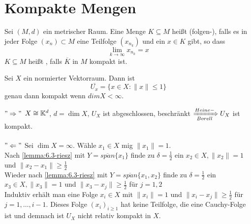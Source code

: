 
\chapter{Kompakte Mengen}

\begin{definition}  
	Sei $(M, d)$ ein metrischer Raum. Eine Menge $K \subseteq M$ hei{\ss}t (folgen-), falls es in jeder Folge $(x_{n}) \subset M$ eine Teilfolge $(x_{n_{k}})$ und ein $x \in K$ gibt, so dass 
		\[ \lim_{k \rightarrow \infty} x_{n_{k}} = x \]
		$K \subseteq M$ hei{\ss}t , falls $\overline{K}$ in $M$ kompakt ist.
\end{definition}

\begin{satz}
	Sei $X$ ein normierter Vektorraum. Dann ist
	\[ \overline{U_{x}} = \{ x \in X: \| x \| \leq 1 \} \]
	genau dann kompakt wenn $dim X < \infty$.
\end{satz}
 	\begin{beweis}
		$"\Rightarrow"$ $X \cong \mathbb{K}^{d}$, $d = \dim X$, $U_X$ ist abgeschlossen, beschränkt $\xRightarrow[Borell]{Heine-} U_{X}$ ist kompakt. \\ \\
		$"\Leftarrow"$ Sei $\dim X = \infty$. Wähle $x_1 \in X$ mig $\| x_1 \| = 1$. \\
		Nach \eqref{lemma:6.3-riesz} mit $ Y = \overline{span}\{ x_{1} \}$ finde zu $\delta = \frac{1}{2}$ ein $x_{2} \in X, \| x_{2} \| = 1$ und $\| x_{2} - x_{1} \| \geq \frac{1}{2}$ \\
		Wieder nach \eqref{lemma:6.3-riesz} mit $ Y = \overline{span}\{ x_{1}, x_{2} \}$ finde zu $\delta = \frac{1}{2}$ ein $x_{3} \in X, \| x_{3} \| = 1$ und $\| x_{3} - x_{j} \| \geq \frac{1}{2}$ für $j = 1, 2$ \\
		Induktiv erhält man eine Folge $x_{i} \in X$ mit $\| x_{i} \| = 1$ und $\| x_{i} - x_{j} \| \geq \frac{1}{2}$ für $j = 1, \dotsc, i - 1$.
		Dieses Folge $(x_{i})_{i \geq 1}$ hat keine Teilfolge, die eine Cauchy-Folge ist und demnach ist $U_{X}$ nicht relativ kompakt in $X$. 
	\end{beweis}


